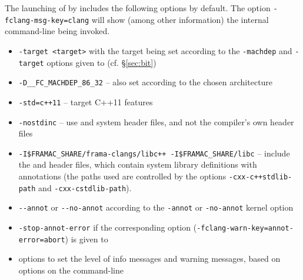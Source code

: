 The launching of \irg by \framac includes the following options by default. The \fc option \lstinline|-fclang-msg-key=clang| will show (among other information) the internal command-line being invoked.
\begin{itemize}
\item \verb|-target <target>| with the target being set according to the \lstinline|-machdep| and \lstinline|-target| options given to \framac (cf. \S\ref{sec:bit})
\item \verb|-D__FC_MACHDEP_86_32| -- also set according to the chosen architecture
\item \verb|-std=c++11| -- target C++11 features
\item \verb|-nostdinc| -- use \fcl and \framac system header files, and not the compiler's own header files
\item \verb|-I$FRAMAC_SHARE/frama-clangs/libc++ -I$FRAMAC_SHARE/libc| -- include the \fclang and \framac header files, which contain system library definitions with \acslpp annotations (the paths used are controlled by the \fc options \lstinline|-cxx-c++stdlib-path| and \lstinline|-cxx-cstdlib-path|).
\item \verb|--annot| or \verb|--no-annot| according to the \verb|-annot| or \verb|-no-annot| \framac kernel option
\item \verb|-stop-annot-error| if the corresponding option (\lstinline|-fclang-warn-key=annot-error=abort|) is given to \framac
\item options to set the level of info messages and warning messages, based on options on the \fc command-line
\end{itemize}
